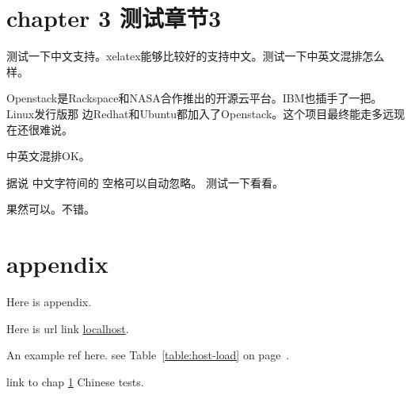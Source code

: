 \documentclass[a4paper,10pt,notitlepage,openany]{book}
\begin{document}
\chapter{chapter 3 测试章节3}\label{chap3}
测试一下中文支持。xelatex能够比较好的支持中文。测试一下中英文混排怎么样。

Openstack是Rackspace和NASA合作推出的开源云平台。IBM也插手了一把。Linux发行版那
边Redhat和Ubuntu都加入了Openstack。这个项目最终能走多远现在还很难说。

中英文混排OK。

据说 中文字符间的    空格可以自动忽略。    测试一下看看。

果然可以。不错。

\appendix
\chapter{appendix}
Here is appendix.

Here is url link \href{http://localhost/}{localhost}.

An example ref here.
see Table~\ref{table:host-load} on page~\pageref{table:host-load}.

link to chap \ref{chap3} Chinese tests.
\end{document}
